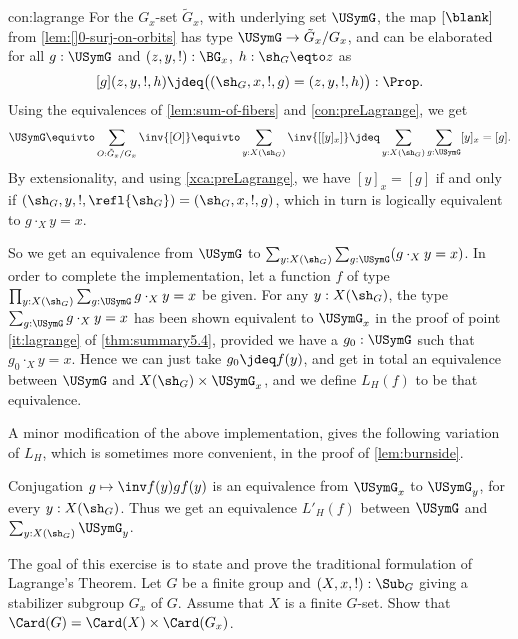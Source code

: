 \begin{implementation}{con:lagrange}
For the $G_x$-set ${\tilde G_x}$, with underlying set $\USymG$, 
the map $[\blank]$ from \cref{lem:[]0-surj-on-orbits} has type 
$\USymG \to {\tilde G_x}/G_x$, and
can be elaborated for all $g:\USymG$ and 
$(z,y,!):\BG_x$, $h:\sh_G\eqto z$ as
\[
[g](z,y,!,h) \jdeq \bigl((\sh_G,x,!,g)=(z,y,!,h)\bigr) : \Prop.
\]
Using the equivalences of \cref{lem:sum-of-fibers} and 
\cref{con:preLagrange}, we get
\[
\USymG
\equivto \sum_{O:{\tilde G_x}/G_x} \inv{[O]}
\equivto \sum_{y:X(\sh_G)} \inv{[[y]_x]} 
\jdeq \sum_{y:X(\sh_G)}\sum_{g:\USymG} [y]_x = [g] .
\]
By extensionality, and using \cref{xca:preLagrange}, 
we have $[y]_x = [g]$ if and only if 
$(\sh_G,y,!,\refl{\sh_G})=(\sh_G,x,!,g)$, which in turn 
is logically equivalent to $g\cdot_X y = x$.

So we get an equivalence from $\USymG$ to 
$\sum_{y:X(\sh_G)}\sum_{g:\USymG} (g\cdot_X y = x)$.
In order to complete the implementation, let a function $f$ of 
type $\prod_{y:X(\sh_G)}\sum_{g:\USymG} g\cdot_X y = x$ be given. 
For any $y:X(\sh_G)$, the type $\sum_{g:\USymG} g\cdot_X y = x$ has been
shown equivalent to $\USymG_x$ in the proof of point \ref{it:lagrange} of \cref{thm:summary5.4},
provided we have a $g_0:\USymG$ such that $g_0\cdot_X y = x$.
Hence we can just take $g_0 \jdeq f(y)$, and get in total an equivalence  
between $\USymG$ and $X(\sh_G) \times \USymG_x$, and we define $L_H(f)$
to be that equivalence.
\end{implementation}

A minor modification of the above implementation, gives the following variation of $L_H$, 
which is sometimes more convenient, \eg in the proof of \cref{lem:burnside}.

\begin{corollary}\label{cor:lagrange-dep-sum}
Conjugation $g\mapsto\inv f(y) g f(y)$ is an equivalence
from $\USymG_x$ to $\USymG_y$, for every $y:X(\sh_G)$.
Thus we get an equivalence $L'_H(f)$ between $\USymG$ and
$\sum_{y:X(\sh_G)}\USymG_y$.
\end{corollary}

\begin{xca}\label{xca:lagrange}
The goal of this exercise is to state and prove the traditional
formulation of  Lagrange's Theorem. 
Let $G$ be a finite group and $(X,x,!):\Sub_G$ giving a 
stabilizer subgroup $G_x$ of $G$.
Assume that $X$ is a finite $G$-set.
Show that $\Card(G) = \Card(X) \times \Card(G_x)$.
\end{xca}


